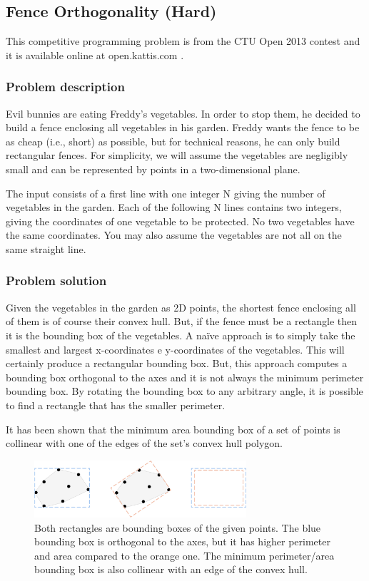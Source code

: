 \documentclass{article}
\begin{document}
\subsection{Fence Orthogonality (Hard)}
This competitive programming problem is from the CTU Open 2013 contest and it is available online at open.kattis.com \cite{fence_orthogonality_problem}.

\subsubsection*{Problem description}
Evil bunnies are eating Freddy’s vegetables. In order to stop them, he decided to build a fence enclosing all vegetables in his garden. Freddy wants the fence to be as cheap (i.e., short) as possible, but for technical reasons, he can only build rectangular fences. For simplicity, we will assume the vegetables are negligibly small and can be represented by points in a two-dimensional plane.

The input consists of a first line with one integer N giving the number of vegetables in the garden. Each of the following N lines contains two integers, giving the coordinates of one vegetable to be protected. No two vegetables have the same coordinates. You may also assume the vegetables are not all on the same straight line.

\subsubsection*{Problem solution}

Given the vegetables in the garden as 2D points, the shortest fence enclosing all of them is of course their convex hull. But, if the fence must be a rectangle then it is the bounding box of the vegetables. A naïve approach is to simply take the smallest and largest x-coordinates e y-coordinates of the vegetables. This will certainly produce a rectangular bounding box. But, this approach computes a bounding box orthogonal to the axes and it is not always the minimum perimeter bounding box. By rotating the bounding box to any arbitrary angle, it is possible to find a rectangle that has the smaller perimeter.

It has been shown \cite{bb_collinear} that the minimum area bounding box of a set of points is collinear with one of the edges of the set's convex hull polygon.

\begin{figure}[h]
\centering
\includegraphics[width=0.7\textwidth]{competitiveprogramming/rotating_callipers.png}
\caption{\label{fig:rotating_callipers} Both rectangles are bounding boxes of the given points. The blue bounding box is orthogonal to the axes, but it has higher perimeter and area compared to the orange one. The minimum perimeter/area bounding box is also collinear with an edge of the convex hull.}
\end{figure}
\end{document}
